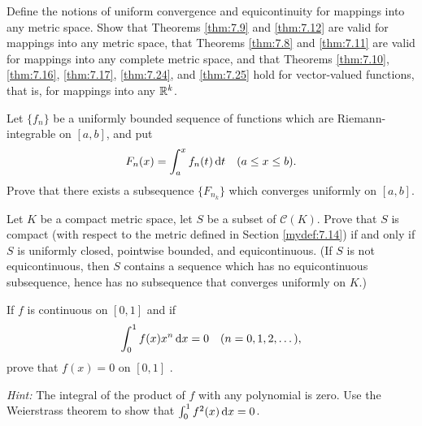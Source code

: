 \begin{myExercise}
    \label{ex:7.17}
    Define the notions of uniform convergence and equicontinuity for mappings into any metric space. 
    Show that Theorems \ref{thm:7.9} and \ref{thm:7.12} are valid for mappings into any metric space, 
    that Theorems \ref{thm:7.8} and \ref{thm:7.11} are valid for mappings into any complete metric space, 
    and that Theorems \ref{thm:7.10}, \ref{thm:7.16}, \ref{thm:7.17}, \ref{thm:7.24}, and \ref{thm:7.25} hold for vector-valued functions, that is, for mappings into any ${\protect\mathbb R}^k$.
\end{myExercise}


\begin{myExercise}
    \label{ex:7.18}
    Let $\{f_n\}$ be a uniformly bounded sequence of functions which are Riemann-integrable on $[a, b]$, and put
    \begin{equation*}
        F_n (x) = \int_{a}^{x} f_n(t) \d t \quad 
        (a \leq x \leq b).
    \end{equation*}
    Prove that there exists a subsequence $\{F_{n_k}\}$ which converges uniformly on $[a,b]$.
\end{myExercise}


\begin{myExercise}
    \label{ex:7.19}
    Let $K$ be a compact metric space, let $S$ be a subset of $\mathscr{C}(K)$. 
    Prove that $S$ is compact 
    (with respect to the metric defined in Section \ref{mydef:7.14}) 
    if and only if $S$ is uniformly closed, pointwise bounded, and equicontinuous. 
    (If $S$ is not equicontinuous, then $S$ contains a sequence which has no equicontinuous subsequence, hence has no subsequence that converges uniformly on $K$.)
\end{myExercise}


\begin{myExercise}
    \label{ex:7.20}
    If $f$ is continuous on $[0,1]$ and if 
    \begin{equation*}
        \int_{0}^{1} f(x) x^n \d x = 0 \quad 
        (n = 0,1,2,\dots),
    \end{equation*}
    prove that $f(x)=0$ on $[0,1]$ .
    
    \emph{Hint:} The integral of the product of $f$ with any polynomial is zero.
    Use the Weierstrass theorem to show that $\int_{0}^{1}f^2(x) \d x = 0$.
\end{myExercise}


